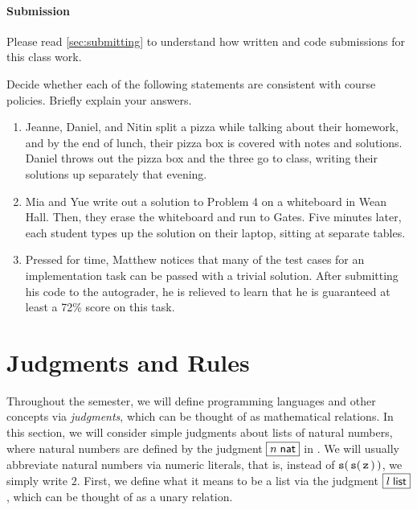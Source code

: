 \documentclass[11pt]{article}
\begin{document}
\paragraph{Submission}
Please read \cref{sec:submitting} to understand how written and code submissions for this class work.

\begin{task}{5}
  Decide whether each of the following statements are consistent with course policies.
  Briefly explain your answers.

  \begin{enumerate}
    \item
      Jeanne, Daniel, and Nitin split a pizza while talking about their homework, and by the end of lunch, their pizza box is covered with notes and solutions.
      Daniel throws out the pizza box and the three go to class, writing their solutions up separately that evening.

    \item
      Mia and Yue write out a solution to Problem 4 on a whiteboard in Wean Hall.
      Then, they erase the whiteboard and run to Gates.
      Five minutes later, each student types up the solution on their laptop, sitting at separate tables.

    \item
      Pressed for time, Matthew notices that many of the test cases for an implementation task can be passed with a trivial solution.
      After submitting his code to the autograder, he is relieved to learn that he is guaranteed at least a 72\% score on this task.


  \end{enumerate}
\end{task}


\section{Judgments and Rules}

Throughout the semester, we will define programming languages and other concepts via \emph{judgments}, which can be thought of as mathematical relations.
In this section, we will consider simple judgments about lists of natural numbers, where natural numbers are defined by the judgment $\boxed{{n}\;{\mathsf{nat}}}$ in \PFPL[2].
We will usually abbreviate natural numbers via numeric literals, that is, instead of ${\mathtt{s}}\mathtt{(}\,{\mathtt{s}}\mathtt{(}\,\mathtt{z}\,\mathtt{)}\,\mathtt{)}$, we simply write $2$.
First, we define what it means to be a list via the judgment $\boxed{{l}\;{\mathsf{list}}}$, which can be thought of as a unary relation.
\end{document}
